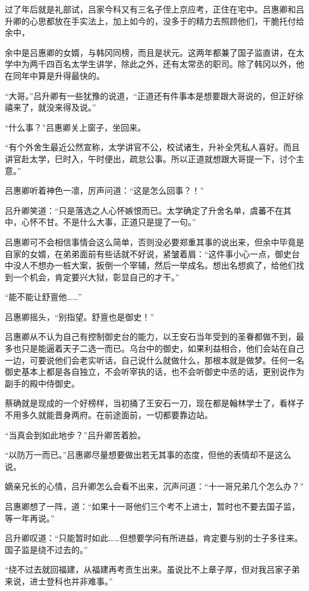 过了年后就是礼部试，吕家今科又有三名子侄上京应考，正住在宅中。吕惠卿和吕升卿的心思都放在手实法上，加上如今的，没多于的精力去照顾他们，干脆托付给余中，

余中是吕惠卿的女婿，与韩冈同榜，而且是状元。这两年都兼了国子监直讲，在太学中为两千四百名太学生讲学，除此之外，还有太常丞的职司。除了韩冈以外，他在同年中算是升得最快的。

“大哥。”吕升卿有一些犹豫的说道，“正道还有件事本是想要跟大哥说的，但正好徐禧来了，就没来得及说。”

“什么事？”吕惠卿关上窗子，坐回来。

“有个外舍生最近公然宣称，太学讲官不公，校试诸生，升补全凭私人喜好。而且讲官赴太学，巳时入，午时便出，疏怠公事。所以正道就想跟大哥提一下，讨个主意。”

吕惠卿听着神色一凛，厉声问道：“这是怎么回事？！”

吕升卿笑道：“只是落选之人心怀嫉恨而已。太学确定了升舍名单，虞蕃不在其中，心怀不甘。不是什么大事，正道只是提了一句。”

吕惠卿可不会相信事情会这么简单，否则没必要郑重其事的说出来，但余中毕竟是自家的女婿，在弟弟面前有些话就不好说，紧皱着眉：“这件事小心一点，御史台中没人不想办一桩大案，扳倒一个宰辅，然后一举成名。想出名想疯了，给他们找到一个机会，肯定要兴大狱，彰显自己的才干。”

“能不能让舒亶他……”

吕惠卿摇头，“别指望。舒亶也是御史！”

吕惠卿从不认为自己有控制御史台的能力，以王安石当年受到的圣眷都做不到，最多也只是能逼着天子二选一而已。乌台中的御史，如果利益相合，他们会站在自己一边，可要说他们会老实听话，自己说什么就做什么，那根本就是做梦。任何一名御史基本上都是各自独立，不会听宰执的话，也不会听御史中丞的话，更别说作为副手的殿中侍御史。

蔡确就是现成的一个好榜样，当初捅了王安石一刀，现在都是翰林学士了，看样子不用多久就能晋身两府。在前途面前，一切都要靠边站。

“当真会到如此地步？”吕升卿苦着脸。

“以防万一而已。”吕惠卿尽量想要做出若无其事的态度，但他的表情却不是这么说。

嫡亲兄长的心情，吕升卿怎么会看不出来，沉声问道：“十一哥兄弟几个怎么办？”

吕惠卿想了一阵，道：“如果十一哥他们三个考不上进士，暂时也不要去国子监，等一年再说。”

吕升卿叹道：“只能暂时如此……但想要学问有所进益，肯定要与别的士子多往来。国子监是绕不过去的。”

“绕不过去就回福建，从福建再考贡生出来。虽说比不上章子厚，但对我吕家子弟来说，进士登科也并非难事。”

